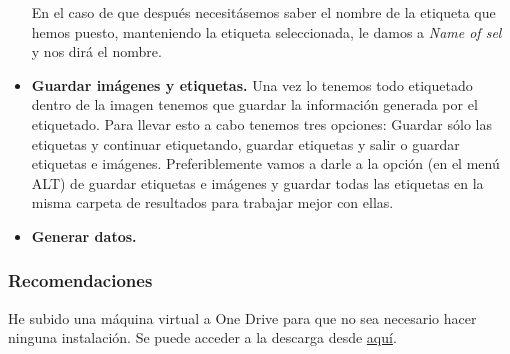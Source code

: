 \begin{itemize}
	En el caso de que después necesitásemos saber el nombre de la etiqueta que hemos puesto, manteniendo la etiqueta seleccionada, le damos a \textit{Name of sel} y nos dirá el nombre.
	\item \textbf{Guardar imágenes y etiquetas.} Una vez lo tenemos todo etiquetado dentro de la imagen tenemos que guardar la información generada por el etiquetado.
	Para llevar esto a cabo tenemos tres opciones: Guardar sólo las etiquetas y continuar etiquetando, guardar etiquetas y salir o guardar etiquetas e imágenes.
	Preferiblemente vamos a darle a la opción (en el menú ALT) de guardar etiquetas e imágenes y guardar todas las etiquetas en la misma carpeta de resultados para trabajar mejor con ellas.
	\item \textbf{Generar datos.}
	
\end{itemize}
\subsubsection{Recomendaciones}
He subido una máquina virtual a One Drive para que no sea necesario hacer ninguna instalación. Se puede acceder a la descarga desde \href{https://universidaddeburgos-my.sharepoint.com/:f:/g/personal/mmb0093_alu_ubu_es/EmokrIxFowNKvCanhqclkqkB90ruM7w-TPeXQS1MQQNmCQ?e=HMXXW4}{aquí}.